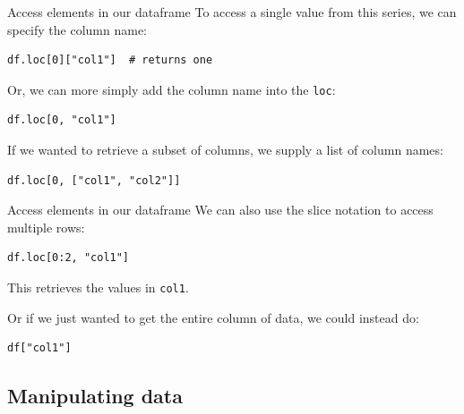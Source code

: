 \documentclass[10pt]{beamer}
\begin{document}
\begin{frame}[label={sec:orgd3a1bc5},fragile]{Access elements in our dataframe}
 To access a single value from this series, we can specify the column name:

\begin{verbatim}
df.loc[0]["col1"]  # returns one
\end{verbatim}

Or, we can more simply add the column name into the \texttt{loc}:

\begin{verbatim}
df.loc[0, "col1"]
\end{verbatim}

If we wanted to retrieve a subset of columns, we supply a list of column names:

\begin{verbatim}
df.loc[0, ["col1", "col2"]]
\end{verbatim}
\end{frame}

\begin{frame}[label={sec:orgb998a5b},fragile]{Access elements in our dataframe}
 We can also use the slice notation to access multiple rows:

\begin{verbatim}
df.loc[0:2, "col1"]
\end{verbatim}

This retrieves the values in \texttt{col1}.

Or if we just wanted to get the entire column of data, we could instead do:

\begin{verbatim}
df["col1"]
\end{verbatim}
\end{frame}

\subsection{Manipulating data}
\label{sec:org2627b4e}
\end{document}
